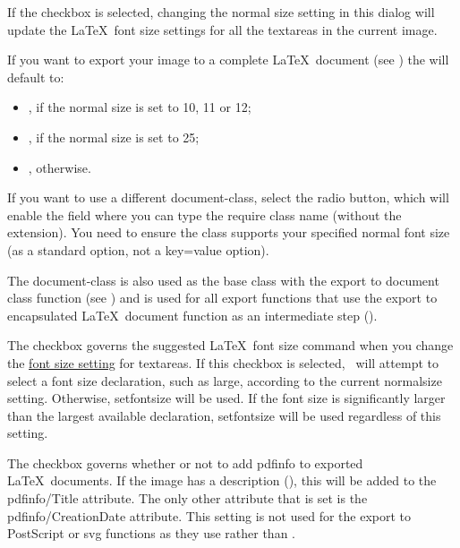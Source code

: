 
If the  \gls*{checkbox} is selected,
changing the normal size setting in this dialog will update the
\LaTeX\ font size settings for all the \glspl{textarea} in the
current image.


If you want to export your image to a complete \LaTeX\ document (see
) the  will default to:
\begin{itemize}
\item {}, if the normal size is
set to 10, 11 or 12;
\item {}, if the normal size is set to
25;
\item {}, otherwise.
\end{itemize}


If you want to use a different \gls{document-class}, select the
 radio button, which will enable the
field where you can type the require class name (without the
 extension). You need to ensure the class supports your
specified normal font size (as a standard option, not a key=value
option).

The \gls{document-class} is also used as the base class with the export to
document class function (see ) and is used
for all export functions that use the export to encapsulated \LaTeX\
document function as an intermediate step ().


The  \gls*{checkbox} governs
the suggested \LaTeX\ font size command when you change the
\hyperref[sec:fontsize]{font size setting} for \glspl{textarea}. If
this \gls*{checkbox} is selected, \FlowframTk\ will attempt to select a
font size declaration, such as \gls{large}, according to the current
normalsize setting. Otherwise, \gls{setfontsize} will be used. If
the font size is significantly larger than the largest available
declaration, \gls{setfontsize} will be used regardless of this
setting.


The  \gls*{checkbox} governs whether or
not to add \gls{pdfinfo} to exported \LaTeX\ documents. If the image
has a description (\sectionref{sec:imagedescription}), this will be
added to the \gls{pdfinfo/Title} attribute. The only other attribute
that is set is the \gls{pdfinfo/CreationDate} attribute. This setting is
not used for the export to PostScript or \gls{svg} functions as they
use \app{latex} rather than \app{pdflatex}.

